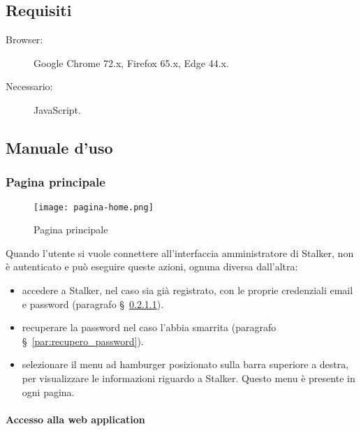 \documentclass[../manuale-utente.tex]{subfiles}
\begin{document}
\subsection{Requisiti}%
\label{sub:web_app_requisiti}

\begin{description}
    \item[Browser:] Google Chrome 72.x, Firefox 65.x, Edge 44.x.
    \item[Necessario:] JavaScript.
\end{description}


\subsection{Manuale d'uso}%
\label{sub:manuale-uso-web}

\subsubsection{Pagina principale}%
\label{subs:pagina_principale}

\begin{figure}[H]
    \centering
    \texttt{[image: pagina-home.png]}
    \caption{Pagina principale}%
    \label{fig:web_app_pagina_principale}
\end{figure}
Quando l'utente si vuole connettere all'interfaccia amministratore di Stalker, non è autenticato e può eseguire queste azioni, ognuna diversa dall'altra:
\begin{itemize}
    \item accedere a Stalker, nel caso sia già registrato, con le proprie credenziali email e password (paragrafo §~\ref{par:accesso_alla_web_application}).
    \item recuperare la password nel caso l'abbia smarrita (paragrafo §~\ref{par:recupero_password}).
    \item selezionare il menu ad hamburger posizionato sulla barra superiore a destra, per visualizzare le informazioni riguardo a Stalker. Questo menu è presente in ogni pagina.
\end{itemize}

\paragraph{Accesso alla web application}%
\label{par:accesso_alla_web_application}
\end{document}
